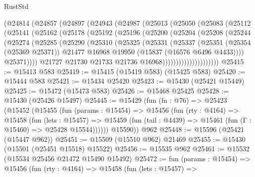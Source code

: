 \begin{lexlean}{RustStd}
\begin{coremodule}
{\begin{coremodule}
{{{{{{{{{{{{{{{{{{{{{{{{{{{{{{{{{{{{{{{{{{{{{{{{{{{{{{{{{{{{      (@24814
        (@24857
          (@24897
            (@24943
              (@24987
                (@25013
                  (@25050
                    (@25083
                      (@25112
                        (@25141
                          (@25162
                            (@25178
                              (@25192
                                (@25196
                                  (@25200
                                    (@25204
                                      (@25208
                                        (@25244
                                          (@25274
                                            (@25285
                                              (@25290
                                                (@25310
                                                  (@25325
                                                    (@25331
                                                      (@25337
                                                        (@25351
                                                          (@25354 (@25369 @25371))
                                                          @21477
                                                          @16968
                                                          @19950
                                                          (@15837 (@16576 @6496 @4433))))
                                                      @25371))))
                                              @21727
                                              @21730
                                              @21733
                                              @21736
                                              @16968)))))))))))))))))))))
@25415 := @15413 @583
@25419 := @15415 (@15419 @583) (@15425 @583)
@25420 := @15444 @583
@25421 := @15434 @25420
@25423 := @15430 (@25421 @15449)
@25425 := @15472 (@15473 @583)
@25426 := @15468 @25425
@25428 := @15430 (@25426 @15497)
@25445 := @15429
    (fun (fn : @76) =>
    @25423
      (@15452
        (@15455
          (fun (params : @15454) =>
          @15456
            (fun (rty : @4164) =>
            @15458
              (fun (lets : @15457) =>
              @15459 (fun (tail : @4439) => @15461 (fun (Γ : @15460) => @25428 @15544))))))
        @15590))
    @962
@25448 := @15596 (@25421 (@15447 @962))
@25451 := @15509 (@15510 @962) @21469
@25455 := @15430 (@15501 (@25451 @15518) @15522)
@25456 := @15535 @962
@25461 := @15532 (@15534 @25456 @21472 @15490 @15492)
@25472 := fun (params : @15454) =>
  @15456
    (fun (rty : @4164) =>
    @15458
      (fun (lets : @15457) =>
}}}}}}}}}}}}}}}}}}}}}}}}}}}}}}}}}}}}}}}}}}}}}}}}}}}}}}}}}}}}
\end{coremodule}}
\end{coremodule}
\end{lexlean}
